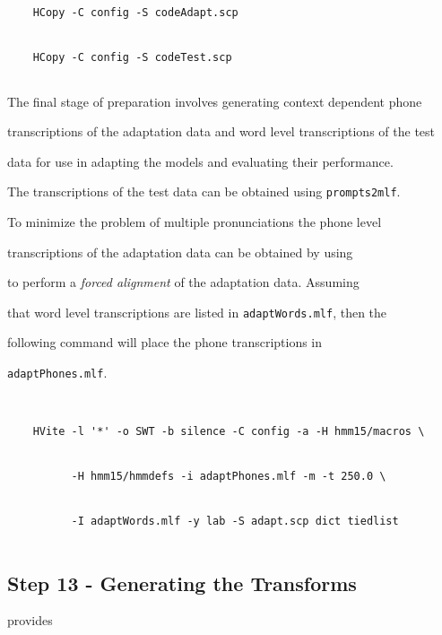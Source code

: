 \begin{verbatim}


    HCopy -C config -S codeAdapt.scp


    HCopy -C config -S codeTest.scp


\end{verbatim}





\noindent


The final stage of preparation involves generating context dependent phone 


transcriptions of the adaptation data and word level transcriptions of the test 


data for use in adapting the models and evaluating their performance.


The transcriptions of the test data can be obtained using \texttt{prompts2mlf}.


To minimize the problem of multiple pronunciations the phone level 


transcriptions of the adaptation data can be obtained by using 


to perform a \textit{forced alignment} of the adaptation data. Assuming 


that word level transcriptions are listed in \texttt{adaptWords.mlf}, then the


following command will place the phone transcriptions in 


\texttt{adaptPhones.mlf}.





\begin{verbatim}


    HVite -l '*' -o SWT -b silence -C config -a -H hmm15/macros \ 


          -H hmm15/hmmdefs -i adaptPhones.mlf -m -t 250.0 \ 


          -I adaptWords.mlf -y lab -S adapt.scp dict tiedlist


\end{verbatim}





\subsection{Step 13 - Generating the Transforms}


  provides



